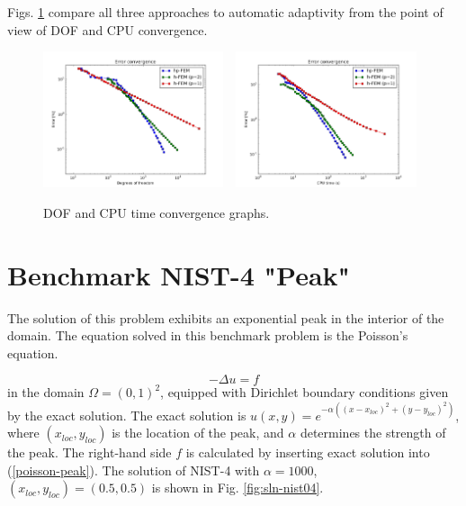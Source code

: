 \documentclass[12pt]{elsarticle}
\begin{document}
Figs. \ref{fig:nist-3-conv} compare all
three approaches to automatic adaptivity from the point
of view of DOF and CPU convergence.

\begin{figure}[H]
\centering
\includegraphics[height=4cm]{nist/nist-3/conv_dof_aniso.png}\ \
\includegraphics[height=4cm]{nist/nist-3/conv_cpu_aniso.png}
\caption{DOF and CPU time convergence graphs.}
\label{fig:nist-3-conv}
\end{figure}


\section{Benchmark NIST-4 "Peak"}
\label{sec:bench-4}

The solution of this problem exhibits an exponential peak in the interior of the domain.
The equation solved in this benchmark problem is the Poisson's equation.

\begin{equation} \label{poisson-peak}
-\Delta u = f
\end{equation}
in the domain $\Omega = (0, 1)^2$, equipped with Dirichlet
boundary conditions given by the exact solution.
The exact solution is
$u(x,y) = e^{-\alpha ((x - x_{loc})^{2} + (y - y_{loc})^{2})}$,
where $(x_{loc}, y_{loc})$ is the location of the peak,
and $\alpha$ determines the strength of the peak.
The right-hand side $f$ is calculated by inserting exact solution into (\ref{poisson-peak}).
The solution of NIST-4 with $\alpha = 1000$,
$(x_{loc}, y_{loc}) = (0.5, 0.5)$ is shown in Fig. \ref{fig:sln-nist04}.
\end{document}
